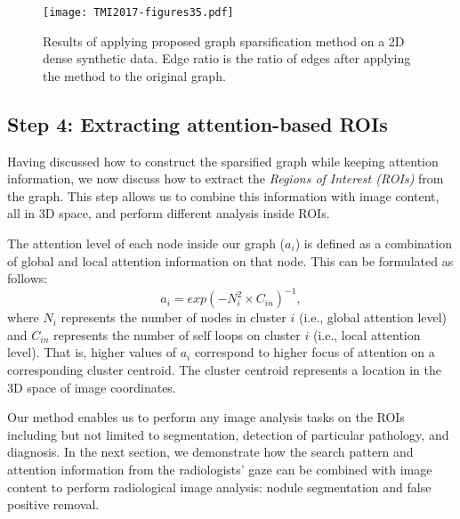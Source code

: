 \documentclass[preprint,12pt]{elsarticle}
\begin{document}
\begin{figure}[h]
\centering
\texttt{[image: TMI2017-figures35.pdf]}
\caption{Results of applying proposed graph sparsification method on a 2D dense synthetic data. Edge ratio is the ratio of edges after applying the method to the original graph. \label{fig:2Dtoy}}
\end{figure}


\subsection{Step 4: Extracting attention-based ROIs}
Having discussed how to construct the sparsified graph while keeping attention information, we now discuss how to extract the \textit{Regions of Interest (ROIs)} from the graph. This step allows us to combine this information with image content, all in 3D space, and perform different analysis inside ROIs.

The attention level of each node inside our graph ($a_{i}$) is defined as a combination of global and local attention information on that node. This can be formulated as follows:
\begin{equation}
a_{i}=exp({-N_{i}^{2}\times C_{in}})^{-1},
\end{equation}
\noindent where $N_{i}$ represents the number of nodes in cluster $i$ (i.e., global attention level) and $C_{in}$ represents the number of self loops on cluster $i$ (i.e., local attention level). That is, higher values of $a_{i}$ correspond to higher focus of attention on a corresponding cluster centroid. The cluster centroid represents a location in the 3D space of image coordinates.

Our method enables us to perform any image analysis tasks on the ROIs including but not limited to segmentation, detection of particular pathology, and diagnosis. In the next section, we demonstrate how the search pattern and attention information from the radiologists' gaze can be combined with image content to perform radiological image analysis: nodule segmentation and false positive removal.
\end{document}
